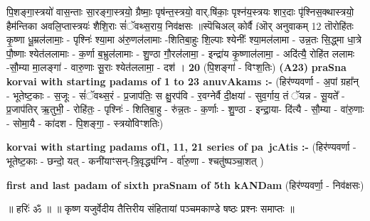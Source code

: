 \documentclass[17pt]{extarticle}
\begin{document}
                  पि॒शङ्गा॒स्त्रयो॑ वास॒न्ताः सा॒रङ्गा॒स्त्रयो॒ ग्रैष्माः॒ पृष॑न्त॒स्त्रयो॒ वार्.षि॑काः॒ पृश्न॑य॒स्त्रयः शार॒दाः पृ॑श्निस॒क्थास्त्रयो॒ हैम॑न्तिका अवलि॒प्तास्त्रयः॑ शैशि॒राः सं॑ॅवथ्स॒राय॒ निव॑क्षसः ॥स्पॆचिअल् कोर्वै fऒर् अनुवाकम् 12 तॊरोहि॑तः कृ॒ष्णा धू॒म्रल॑लामाः॒ - पृश्निः॑ श्या॒मा अ॑रु॒णल॑लामाः -शितिबा॒हुः शि॒ल्पाः श्येनीः᳚ श्या॒मल॑लामा - उन्न॒तः सि॒द्ध्मा धा॒त्रे पौ॒ष्णाः श्येत॑ललामाः - क॒र्णा ब॒भ्रुल॑लामाः - शु॒ण्ठा गौ॒रल॑लामा॒ - इन्द्रा॑य कृ॒ष्णाल॑लामा॒ - अदि॑त्यै॒ रोहि॑त ललामः -सौ॒म्या मा॒लङ्गा॑ - वारु॒णाः सू॒राः श्येत॑ललामा॒ - दश॑ । \textbf{  20 } \newline
                  \newline
                      (पि॒शङ्गा॑ - विꣳश॒तिः)  \textbf{(A23)} \newline \newline
                \textbf{praSna korvai with starting padams of 1 to 23 anuvAkams :-} \newline
        (हिर॑ण्यवर्णा - अ॒पां ग्रहा᳚न् - भूतेष्ट॒काः - स॒जूः - सं॑ॅवथ्स॒रं - प्र॒जाप॑तिः॒ स क्षु॒रप॑वि - र॒वग्नेर्वै दी॒क्षया॑ - सुव॒र्गाय॒ तं ॅयन्न - सू॒यते᳚ - प्र॒जाप॑तिर् ऋ॒तुभी॒ - रोहि॑तः॒ - पृश्निः॑ - शितिबा॒हु - रु॑न्न॒तः - क॒र्णाः - शु॒ण्ठा - इन्द्रा॒या- दि॑त्यै - सौ॒म्या - वा॑रु॒णाः - सोमा॒यै - का॑दश - पि॒शङ्गा॒ - स्त्रयो॑विꣳशतिः) \newline

        \textbf{korvai with starting padams of1, 11, 21 series of pa~jcAtis :-} \newline
        (हिर॑ण्यवर्णा - भूतेष्ट॒काः - छन्दो॒ यत् - कनी॑याꣳसन्-त्रि॒वृद्ध्य॑ग्नि - र्वा॑रु॒णा - श्चतु॑ष्पञ्चा॒शत् ) \newline

        \textbf{first and last padam of sixth praSnam of 5th kANDam} \newline
        (हिर॑ण्यवर्णा॒ - निव॑क्षसः) \newline 

        
        ॥ हरिः॑ ॐ ॥
॥ कृष्ण यजुर्वेदीय तैत्तिरीय संहितायां पञ्चमकाण्डे षष्ठः प्रश्नः समाप्तः ॥ \newline
        \pagebreak
                \pagebreak
        
\end{document}
